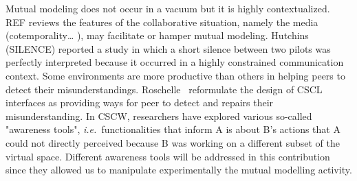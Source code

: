 \documentclass[twocolumn]{article}
\newcommand{\ie}{{\textit{i.e.\ }}}
\begin{document}
Mutual modeling does not occur in a vacuum but it is highly contextualized. REF
reviews the features of the collaborative situation, namely the media
(cotemporality… ), may facilitate or hamper mutual modeling. Hutchins (SILENCE)
reported a study in which a short silence between two pilots was perfectly
interpreted because it occurred in a highly constrained communication context.
Some environments are more productive than others in helping peers to detect
their misunderstandings. Roschelle~\cite{roschelle1995construction} reformulate
the design of CSCL interfaces as providing ways for peer to detect and repairs
their misunderstanding. In CSCW, researchers have explored various so-called
"awareness tools", \ie functionalities that inform A is about B's actions that A
could not directly perceived because B was working on a different subset of the
virtual space. Different awareness tools will be addressed in this contribution
since they allowed us to manipulate experimentally the mutual modelling activity. 
\end{document}
